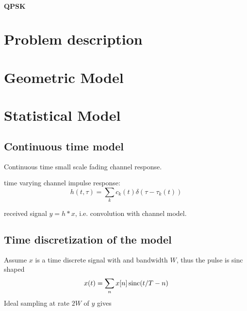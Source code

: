 \paragraph{QPSK}

\section{Problem description}

\section{Geometric Model}

\section{Statistical Model}


\subsection{Continuous time model}

Continuous time small scale fading channel response. \cite{Alimohammad2009}

time varying channel impulse response:
\begin{equation}
	h(t, \tau) = \sum_k c_k (t) \delta(\tau - \tau_k(t))
\end{equation}

received signal \(y = h * x\), i.e. convolution with channel model. 

\subsection{Time discretization of the model}


Assume \(x\) is a time discrete signal with and bandwidth \(W\), thus the pulse is sinc shaped
\begin{equation}
	x(t) = \sum_n x[n] \operatorname{sinc}(t/T - n)
\end{equation}
Ideal sampling at rate \(2W\) of \(y\) gives
